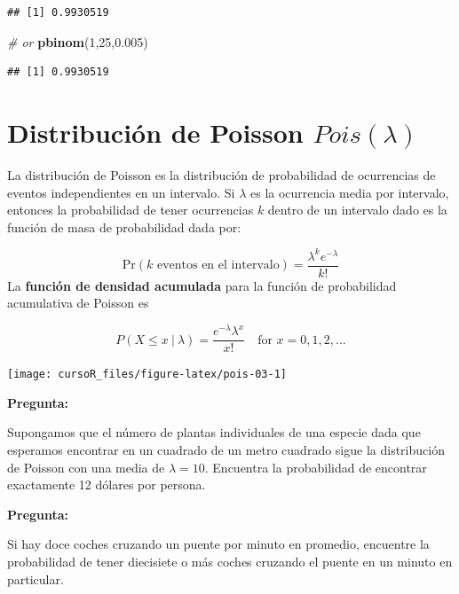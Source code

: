 \documentclass[]{book}
\newenvironment{Shaded}{\begin{snugshade}}{\end{snugshade}}
\newcommand{\KeywordTok}[1]{\textcolor[rgb]{0.13,0.29,0.53}{\textbf{#1}}}
\newcommand{\DecValTok}[1]{\textcolor[rgb]{0.00,0.00,0.81}{#1}}
\newcommand{\FloatTok}[1]{\textcolor[rgb]{0.00,0.00,0.81}{#1}}
\newcommand{\CommentTok}[1]{\textcolor[rgb]{0.56,0.35,0.01}{\textit{#1}}}
\newcommand{\NormalTok}[1]{#1}
\begin{document}
\begin{verbatim}
## [1] 0.9930519
\end{verbatim}

\begin{Shaded}
\begin{Highlighting}[]
\CommentTok{# or}
\KeywordTok{pbinom}\NormalTok{(}\DecValTok{1}\NormalTok{,}\DecValTok{25}\NormalTok{,}\FloatTok{0.005}\NormalTok{)}
\end{Highlighting}
\end{Shaded}

\begin{verbatim}
## [1] 0.9930519
\end{verbatim}

\section{\texorpdfstring{Distribución de Poisson
\(Pois(\lambda)\)}{Distribución de Poisson Pois(\textbackslash{}lambda)}}\label{distribuciuxf3n-de-poisson-poislambda}

La distribución de Poisson es la distribución de probabilidad de
ocurrencias de eventos independientes en un intervalo. Si \(\lambda\) es
la ocurrencia media por intervalo, entonces la probabilidad de tener
ocurrencias \(k\) dentro de un intervalo dado es la función de masa de
probabilidad dada por:

\[
\mbox{Pr}(\mbox{$k$ eventos en el intervalo}) = \frac{\lambda^k e^{-\lambda}}{k!}
\] La \textbf{función de densidad acumulada} para la función de
probabilidad acumulativa de Poisson es

\[
P(X\leq x ~|~\lambda ) = \frac{e^{-\lambda} \lambda ^x}{x!}\quad \mbox{for $x=0,1,2,...$}
\]

\begin{center}\texttt{[image: cursoR\_files/figure-latex/pois-03-1]} \end{center}

\textbf{Pregunta:}

Supongamos que el número de plantas individuales de una especie dada que
esperamos encontrar en un cuadrado de un metro cuadrado sigue la
distribución de Poisson con una media de \(\lambda= 10\). Encuentra la
probabilidad de encontrar exactamente 12 dólares por persona.

\textbf{Pregunta:}

Si hay doce coches cruzando un puente por minuto en promedio, encuentre
la probabilidad de tener diecisiete o más coches cruzando el puente en
un minuto en particular.
\end{document}
